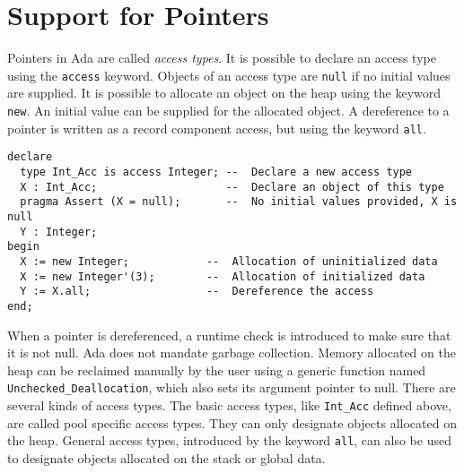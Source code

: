 \documentclass[runningheads]{llncs}
\begin{document}
\section{Support for Pointers\label{sec-pointers}}
Pointers in Ada are called \emph{access types}. It is possible to declare an access type using the \texttt{access} keyword.
Objects of an access type are \texttt{null} if no initial values are supplied.
It is possible to allocate an object on the heap using the keyword \texttt{new}. An initial value can be supplied for the allocated object.
A dereference to a pointer is written as a record component access, but using the keyword \texttt{all}.
\begin{lstlisting}
declare
  type Int_Acc is access Integer; --  Declare a new access type
  X : Int_Acc;                    --  Declare an object of this type
  pragma Assert (X = null);       --  No initial values provided, X is null
  Y : Integer;
begin
  X := new Integer;            --  Allocation of uninitialized data
  X := new Integer'(3);        --  Allocation of initialized data
  Y := X.all;                  --  Dereference the access
end;
\end{lstlisting}
When a pointer is dereferenced, a runtime check is introduced to make sure that it is not null.
Ada does not mandate garbage collection. Memory allocated on the heap can be reclaimed manually by the user using a generic function named \texttt{Unchecked\_Deallocation}, which also sets its argument pointer to null.
There are several kinds of access types. The basic access types, like \texttt{Int\_Acc} defined above, are called pool specific access types. They can only designate objects allocated on the heap. General access types, introduced by the keyword \texttt{all}, can also be used to designate objects allocated on the stack or global data.
\end{document}
